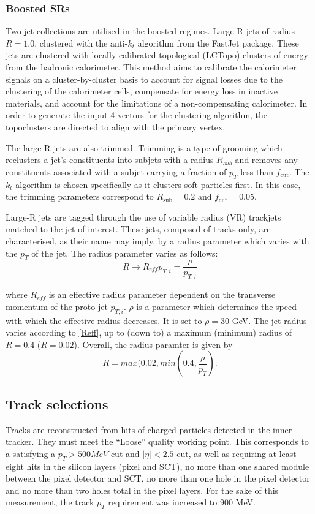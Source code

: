 \documentclass[10pt,a4paper]{book}
\begin{document}
\subsubsection{Boosted SRs}

Two jet collections are utilised in the boosted regimes. Large-R jets of radius $R = 1.0$, clustered with the anti-$k_t$ algorithm from the FastJet package. These jets are clustered with locally-calibrated topological (LCTopo) clusters of energy from the hadronic calorimeter.  This method aims to calibrate the calorimeter signals on a cluster-by-cluster basis to account for signal losses due to the clustering of the calorimeter cells, compensate for energy loss in inactive materials, and account for the limitations of a non-compensating calorimeter. In order to generate the input 4-vectors for the clustering algorithm, the topoclusters are directed to align with the primary vertex.

The large-R jets are also trimmed. Trimming is a type of grooming which reclusters a jet's constituents into subjets with a radius $R_{sub}$ and removes any constituents associated with a subjet carrying a fraction of $p_T$ less than $f_\mathrm{cut}$. The $k_t$ algorithm is chosen specifically as it clusters soft particles first. In this case, the trimming parameters correspond to $R_{\mathrm{sub}} = 0.2$ and $f_{\mathrm{cut}} = 0.05$. 

Large-R jets are tagged through the use of variable radius (VR) trackjets matched to the jet of interest. These jets, composed of tracks only, are characterised, as their name may imply, by a radius parameter which varies with the $p_T$ of the jet. The radius parameter varies as follows:
\begin{equation}
R \rightarrow R_{eff}{p_{T,i}} = \frac{\rho}{p_{T,i}}
\label{Reff}
\end{equation} 

where $R_{eff}$ is an effective radius parameter dependent on the transverse momentum of the proto-jet $p_{T,i}$. $\rho$ is a parameter which determines the speed with which the effective radius decreases. It is set to $\rho = 30$ GeV. The jet radius varies according to \ref{Reff}, up to (down to) a maximum (minimum) radius of $R = 0.4$ ($R = 0.02$). Overall, the radius paramter is given by 
\begin{equation}
R = max(0.02, min(0.4, \frac{\rho}{p_T}).
\end{equation}



\subsection{Track selections}
\label{track sel}
Tracks are reconstructed from hits of charged particles detected in the inner tracker. They must meet the ``Loose'' quality working point. This corresponds to a satisfying a $p_T > 500 MeV$ cut and $\vert \eta \vert < 2.5$ cut, as well as requiring at least eight hits in the silicon layers (pixel and SCT), no more than one shared module between the pixel detector and SCT, no more than one hole in the pixel detector and no more than two holes total in the pixel layers. For the sake of this measurement, the track $p_T$ requirement was increased to 900 MeV.
\end{document}

